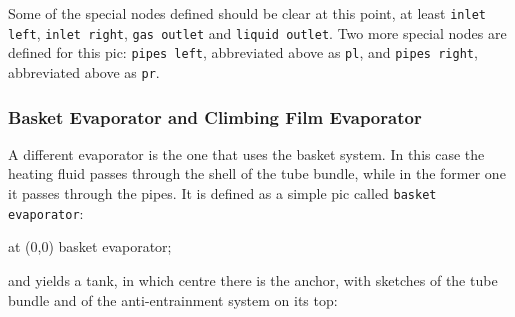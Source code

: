 \documentclass[12pt]{article}						%
\newcommand*{\chpn}[1]{\texttt{#1}}				%
\newcommand*{\chpp}[1]{\texttt{#1}}				%
\begin{document}
Some of the special nodes defined should be clear at this point, at least
\chpn{inlet left}, \chpn{inlet right}, \chpn{gas outlet} and
\chpn{liquid outlet}. Two more special nodes are defined for this pic:
\chpn{pipes left}, abbreviated above as \chpn{pl}, and \chpn{pipes right},
abbreviated above as \chpn{pr}.

\subsubsection{Basket Evaporator and Climbing Film Evaporator}

A different evaporator is the one that uses the basket system. In this case the
heating fluid passes through the shell of the tube bundle, while in the former
one it passes through the pipes. It is defined as a simple pic called
\chpp{basket evaporator}:
\begin{chpcode}
	\pic at (0,0) {basket evaporator};
\end{chpcode}
and yields a tank, in which centre there is the anchor, with sketches of the
tube bundle and of the anti-entrainment system on its top:
\begin{center}
\end{center}
\end{document}
